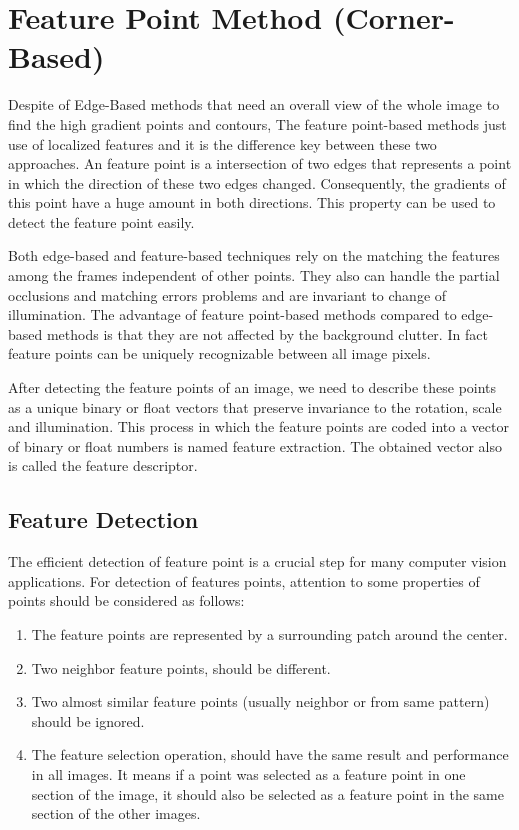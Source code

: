 \section{Feature Point Method (Corner-Based)} \label{sec:feature_point_method}
Despite of Edge-Based methods that need an overall view of the whole image to find the high gradient points and contours, The feature point-based methods just use of localized features and it is the difference key between these two approaches. An feature point is a intersection of two edges that represents a point in which the direction of these two edges changed. Consequently, the gradients of this point have a huge amount in both directions. This property can be used to detect the feature point easily.

Both edge-based and feature-based techniques rely on the matching the features among the frames independent of other points. They also can handle the partial occlusions and matching errors problems and are invariant to change of illumination. The advantage of feature point-based methods compared to edge-based methods is that they are not affected by the background clutter. In fact feature points can be uniquely recognizable between all image pixels.

After detecting the feature points of an image, we need to describe these points as a unique binary or float vectors that preserve invariance to the rotation, scale and illumination. This process in which the feature points are coded into a vector of binary or float numbers is named feature extraction. The obtained vector also is called the feature descriptor.

\subsection{Feature Detection} \label{subsec:feature_detection}
 The efficient detection of feature point is a crucial step for many computer vision applications. For detection of features points, attention to some properties of points should be considered as follows: \cite{forstner1986feature}
\begin{enumerate}
  \item The feature points are represented by a surrounding patch around the center.
  \item Two neighbor feature points, should be different.
  \item Two almost similar feature points (usually neighbor or from same pattern) should be ignored.
  \item The feature selection operation, should have the same result and performance in all images. It means if a point was selected as a feature point in one section of the image, it should also be selected as a feature point in the same section of the other images.
\end{enumerate}

